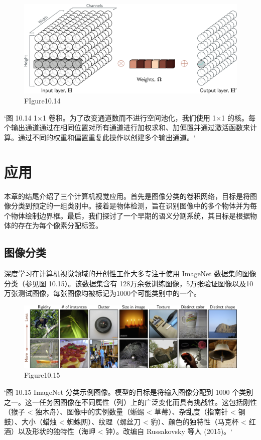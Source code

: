 \begin{figure}[h!]
\centering
\includegraphics[width=0.7\linewidth]{png/chapter10/Conv1DChannels.png}
\caption{FIgure10.14}
\end{figure}

`图 10.14 1×1 卷积。为了改变通道数而不进行空间池化，我们使用 1×1 的核。每个输出通道通过在相同位置对所有通道进行加权求和、加偏置并通过激活函数来计算。通过不同的权重和偏置重复此操作以创建多个输出通道。`
\section{应用}
本章的结尾介绍了三个计算机视觉应用。首先是图像分类的卷积网络，目标是将图像分类到预定的一组类别中。接着是物体检测，旨在识别图像中的多个物体并为每个物体绘制边界框。最后，我们探讨了一个早期的语义分割系统，其目标是根据物体的存在为每个像素分配标签。

\subsection{图像分类}
深度学习在计算机视觉领域的开创性工作大多专注于使用 ImageNet 数据集的图像分类（参见图 10.15）。该数据集含有 128万余张训练图像，5万张验证图像以及10万张测试图像，每张图像均被标记为1000个可能类别中的一个。



\begin{figure}[h!]
\centering
\includegraphics[width=0.7\linewidth]{png/chapter10/ConvImageNet.png}
\caption{Figure10.15}
\end{figure}

`图 10.15 ImageNet 分类示例图像。模型的目标是将输入图像分配到 1000 个类别之一。这一任务因图像在不同属性（列）上的广泛变化而具有挑战性。这包括刚性（猴子 < 独木舟）、图像中的实例数量（蜥蜴 < 草莓）、杂乱度（指南针 < 钢鼓）、大小（蜡烛 < 蜘蛛网）、纹理（螺丝刀 < 豹）、颜色的独特性（马克杯 < 红酒）以及形状的独特性（海岬 < 钟）。改编自 Russakovsky 等人 (2015)。`


